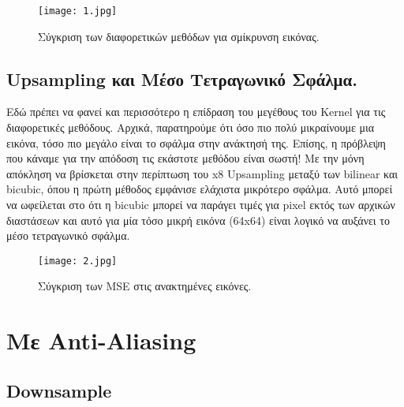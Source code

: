 \documentclass[11pt]{scrartcl} %
\begin{document}
\begin{figure}[h] %
	\centering
	\texttt{[image: 1.jpg]} %
	\caption{Σύγκριση των διαφορετικών μεθόδων για σμίκρυνση εικόνας.}
\end{figure}


\subsection{Upsampling και Μέσο Τετραγωνικό Σφάλμα.}

Εδώ πρέπει να φανεί και περισσότερο η επίδραση του μεγέθους του Kernel για τις διαφορετικές μεθόδους.
Αρχικά, παρατηρούμε ότι όσο πιο πολύ μικραίνουμε μια εικόνα, τόσο πιο μεγάλο είναι το σφάλμα στην ανάκτησή της.
Επίσης, η πρόβλεψη που κάναμε για την απόδοση τις εκάστοτε μεθόδου είναι σωστή! Με την μόνη απόκληση να βρίσκεται
στην περίπτωση του x8 Upsampling μεταξύ των bilinear και bicubic, όπου η πρώτη μέθοδος εμφάνισε ελάχιστα μικρότερο σφάλμα.
Αυτό μπορεί να ωφείλεται στο ότι η bicubic μπορεί να παράγει τιμές για pixel εκτός των αρχικών διαστάσεων και αυτό για
μία τόσο μικρή εικόνα (64x64) είναι λογικό να αυξάνει το μέσο τετραγωνικό σφάλμα.

\begin{figure}[h] %
	\centering
	\texttt{[image: 2.jpg]} %
	\caption{Σύγκριση των MSE στις ανακτημένες εικόνες.}
\end{figure}


\newpage

\section{Με Αnti-Αliasing}

\subsection{Downsample}
\end{document}

